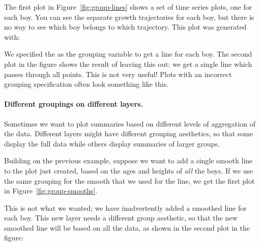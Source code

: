 The first plot in Figure~\ref{fig:group-lines} shows a set of time series plots, one for each boy. You can see the separate growth trajectories for each boy, but there is no way to see which boy belongs to which trajectory.  This plot was generated with:

%


\noindent We specified the  as the grouping variable to get a line for each boy. The second plot in the figure shows the result of leaving this out: we get a single line which passes through all points.  This is not very useful! Plots with an incorrect grouping specification often look something like this.

% 


\paragraph{Different groupings on different layers.}  Sometimes we want to plot summaries based on different levels of aggregation of the data. Different layers might have different grouping aesthetics, so that some display the full data while others display summaries of larger groups.

Building on the previous example, suppose we want to add a single smooth line to the plot just created, based on the ages and heights of {\em all} the boys.  If we use the same grouping for the smooth that we used for the line, we get the first plot in Figure~\ref{fig:group-smooths}.  

% 


This is not what we wanted; we have inadvertently added a smoothed line for each boy. This new layer needs a different group aesthetic, so that the new smoothed line will be based on all the data, as shown in the second plot in the figure:

